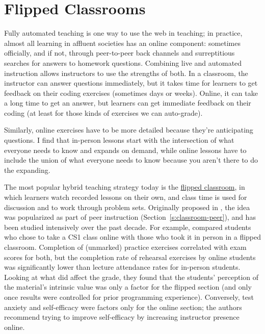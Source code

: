 \section{Flipped Classrooms}\label{s:online-flipped}

Fully automated teaching is one way to use the web in teaching; in
practice, almost all learning in affluent societies has an online
component: sometimes officially, and if not, through peer-to-peer back
channels and surreptitious searches for answers to homework questions.
Combining live and automated instruction allows instructors to use the
strengths of both. In a classroom, the instructor can answer questions
immediately, but it takes time for learners to get feedback on their
coding exercises (sometimes days or weeks). Online, it can take a long
time to get an answer, but learners can get immediate feedback on their
coding (at least for those kinds of exercises we can auto-grade).

Similarly, online exercises have to be more detailed because they're
anticipating questions. I find that in-person lessons start with the
intersection of what everyone needs to know and expands on demand, while
online lessons have to include the union of what everyone needs to know
because you aren't there to do the expanding.

The most popular hybrid teaching strategy today is the
\protect\hyperlink{g:flipped-classroom}{flipped classroom}, in which learners
watch recorded lessons on their own, and class time is used for
discussion and to work through problem sets. Originally proposed in
\cite{King1993}, the idea was popularized as part of peer instruction
(Section~\ref{s:classroom-peer}), and has been studied intensively over
the past decade. For example, \cite{Camp2016} compared students who
chose to take a CS1 class online with those who took it in person in a
flipped classroom. Completion of (unmarked) practice exercises
correlated with exam scores for both, but the completion rate of
rehearsal exercises by online students was significantly lower than
lecture attendance rates for in-person students. Looking at what did
affect the grade, they found that the students' perception of the
material's intrinsic value was only a factor for the flipped section
(and only once results were controlled for prior programming
experience). Conversely, test anxiety and self-efficacy were factors
only for the online section; the authors recommend trying to improve
self-efficacy by increasing instructor presence online.

